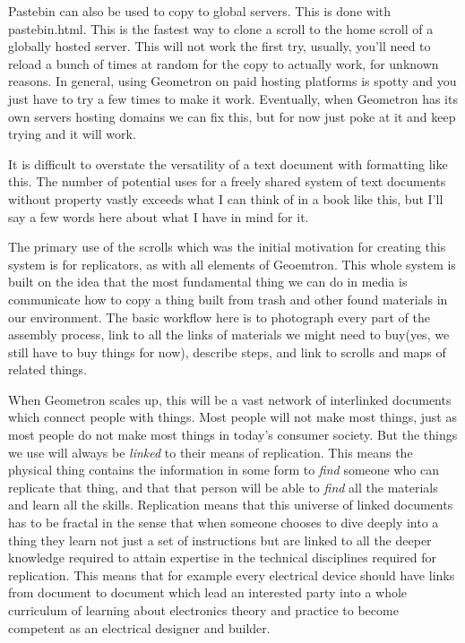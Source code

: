 Pastebin can also be used to copy to global servers.  This is done with pastebin.html. This is the fastest way to clone a scroll to the home scroll of a globally hosted server.  This will not work the first try, usually, you'll need to reload a bunch of times at random for the copy to actually work, for unknown reasons.  In general, using Geometron on paid hosting platforms is spotty and you just have to try a few times to make it work.  Eventually, when Geometron has its own servers hosting domains we can fix this, but for now just poke at it and keep trying and it will work. 

It is difficult to overstate the versatility of a text document with formatting like this.  The number of potential uses for a freely shared system of text documents without property vastly exceeds what I can think of in a book like this, but I'll say a few words here about what I have in mind for it. 

The primary use of the scrolls which was the initial motivation for creating this system is for replicators, as with all elements of Geoemtron.  This whole system is built on the idea that the most fundamental thing we can do in media is communicate how to copy a thing built from trash and other found materials in our environment.  The basic workflow here is to photograph every part of the assembly process, link to all the links of materials we might need to buy(yes, we still have to buy things for now), describe steps, and link to scrolls and maps of related things.  

When Geometron scales up, this will be a vast network of interlinked documents which connect people with things.  Most people will not make most things, just as most people do not make most things in today's consumer society.  But the things we use will always be \emph{linked} to their means of replication.  This means the physical thing contains the information in some form to \emph{find} someone who can replicate that thing, and that that person will be able to \emph{find} all the materials and learn all the skills.  Replication means that this universe of linked documents has to be fractal in the sense that when someone chooses to dive deeply into a thing they learn not just a set of instructions but are linked to all the deeper knowledge required to attain expertise in the technical disciplines required for replication. This means that for example every electrical device should have links from document to document which lead an interested party into a whole curriculum of learning about electronics theory and practice to become competent as an electrical designer and builder.

